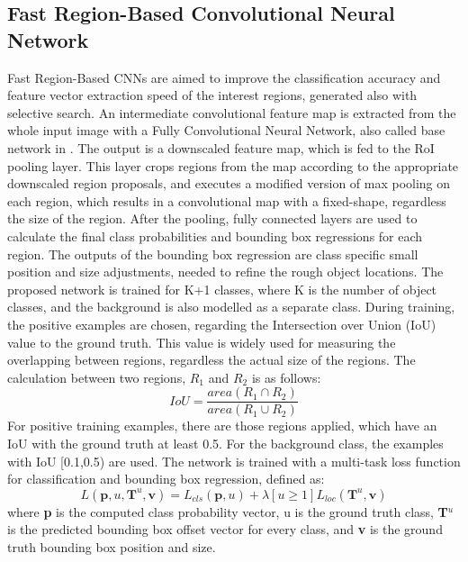 \subsection{Fast Region-Based Convolutional Neural Network}\label{s:fastrcnn}
Fast Region-Based CNNs \cite{Girshick:2016:RCN:2881668.2882239} are aimed to improve the classification accuracy and feature vector extraction speed of the interest regions, generated also with selective search. An intermediate convolutional feature map is extracted from the whole input image with a Fully Convolutional Neural Network, also called base network in \citep{journals/corr/SermanetEZMFL13}. The output is a downscaled feature map, which is fed to the RoI pooling layer. This layer crops regions from the map according to the appropriate downscaled region proposals, and executes a modified version of max pooling on each region, which results in a convolutional map with a fixed-shape, regardless the size of the region.
\bigbreak
After the pooling, fully connected layers are used to calculate the final class probabilities and bounding box regressions for each region. The outputs of the bounding box regression are class specific small position and size adjustments, needed to refine the rough object locations.
\bigbreak
The proposed network is trained for K+1 classes, where K is the number of object classes, and the background is also modelled as a separate class. During training, the positive examples are chosen, regarding the Intersection over Union (IoU) value to the ground truth. This value is widely used for measuring the overlapping between regions, regardless the actual size of the regions. The calculation between two regions, $R_1$ and $R_2$ is as follows:
\bigbreak
\begin{equation}
        \mathit{IoU} = \frac{\mathit{area}( R_1 \cap R_2 )}{\mathit{area} ( R_1 \cup R_2 )}
        \label{eq:iou}
\end{equation}
\bigbreak
For positive training examples, there are those regions applied, which have an IoU with the ground truth at least 0.5. For the background class, the examples with IoU [0.1,0.5) are used.
\bigbreak
The network is trained with a multi-task loss function for classification and bounding box regression, defined as:
\bigbreak
\begin{equation}\label{eq:frcnn-loss}
	L(\mathbf{p}, u, \mathbf{T}^u, \mathbf{v}) = L_{cls}(\mathbf{p}, u) + \lambda [u \ge 1] L_{loc}(\mathbf{T}^u, \mathbf{v})
\end{equation}
\bigbreak
where \textbf{p} is the computed class probability vector, u is the ground truth class, \textbf{T}$^u$ is the predicted bounding box offset vector for every class, and \textbf{v} is the ground truth bounding box position and size.
